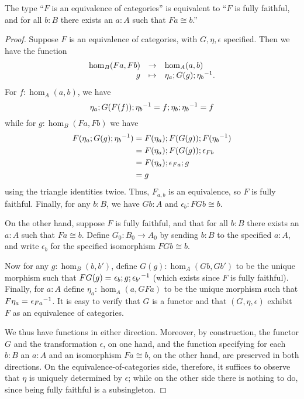 \begin{lem}\label{ct:ffeso}
  The type ``$F$ is an equivalence of categories'' is equivalent to ``$F$ is fully faithful, and for all $b:B$ there exists an $a:A$ such that $Fa\cong b$.''
\end{lem}
\begin{proof}
  Suppose $F$ is an equivalence of categories, with $G,\eta,\epsilon$ specified.  Then we have the function
  \begin{equation*}
    \begin{array}{rcl}
      \hom_B(Fa,Fb) &\to& \hom_A(a,b)\\
      g &\mapsto&  \eta_a;G(g);{\eta_b}^{-1}.
    \end{array}
  \end{equation*}
  For $f:\hom_A(a,b)$, we have
  \[ \eta_{a};G(F(f));{\eta_{b}}^{-1} =
  f ; \eta_{b}; {\eta_{b}}^{-1} =
  f
  \]
  while for $g:\hom_B(Fa,Fb)$ we have
  \begin{align*}
    F(\eta_a;G(g);{\eta_b}^{-1})
    &= F(\eta_a);F(G(g)); F({\eta_b}^{-1})\\
    &= F(\eta_a);F(G(g)); \epsilon_{Fb}\\
    &= F(\eta_a);\epsilon_{Fa};g\\
    &= g
  \end{align*}
  using the triangle identities twice.  Thus, $F_{a,b}$ is an equivalence, so $F$ is fully faithful.  Finally, for any $b:B$, we have $Gb:A$ and $\epsilon_b:FGb\cong b$.

  On the other hand, suppose $F$ is fully faithful, and that for all $b:B$ there exists an $a:A$ such that $Fa\cong b$.  Define $G_0:B_0\to A_0$ by sending $b:B$ to the specified $a:A$, and write $\epsilon_b$ for the specified isomorphism $FGb\cong b$.

  Now for any $g:\hom_B(b,b')$, define $G(g):\hom_A(Gb,Gb')$ to be the unique morphism such that $FG(g) =_{} \epsilon_b;g;{\epsilon_{b'}}^{-1}$ (which exists since $F$ is fully faithful).  Finally, for $a:A$ define $\eta_a:\hom_A(a,GFa)$ to be the unique morphism such that $F\eta_a =_{} {\epsilon_{Fa}}^{-1}$.  It is easy to verify that $G$ is a functor and that $(G,\eta,\epsilon)$ exhibit $F$ as an equivalence of categories.

  We thus have functions in either direction.  Moreover, by construction, the functor $G$ and the transformation $\epsilon$, on one hand, and the function specifying for each $b:B$ an $a:A$ and an isomorphism $Fa\cong b$, on the other hand, are preserved in both directions.  On the equivalence-of-categories side, therefore, it suffices to observe that $\eta$ is uniquely determined by $\epsilon$; while on the other side there is nothing to do, since being fully faithful is a subsingleton.
\end{proof}

